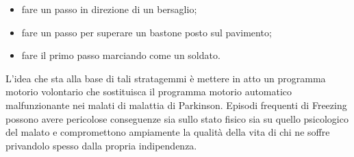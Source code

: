 \begin{itemize}
	\item fare un passo in direzione di un bersaglio;
	\item fare un passo per superare un bastone posto sul pavimento;
	\item fare il primo passo marciando come un soldato.
\end{itemize}
L’idea che sta alla base di tali stratagemmi è mettere in atto un programma motorio volontario che sostituisca il programma motorio automatico malfunzionante nei malati di malattia di Parkinson. Episodi frequenti di Freezing possono avere pericolose conseguenze sia sullo stato fisico sia su quello psicologico del malato e compromettono ampiamente la qualità della vita di chi ne soffre privandolo spesso dalla propria indipendenza.\\
